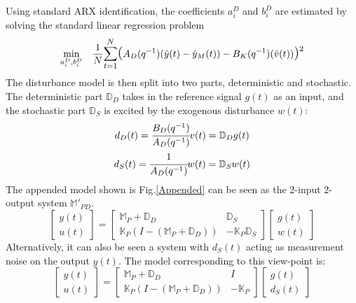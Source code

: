 \documentclass[letterpaper, 10 pt, conference]{ieeeconf}  %
\begin{document}
	Using standard ARX identification, the coefficients $a_i^D$ and $b_i^D$ are estimated by solving the standard linear regression problem
	\begin{equation}
	\begin{aligned}
	& \underset{a_i^D,b_i^D}{\text{min}}
	& & \frac{1}{N}\mathlarger{\sum\limits_{t=1}^N}\mathlarger{\mathlarger{(}}A_D(q^{-1})(\hat{y}(t)-\hat{y}_M(t))-B_K(q^{-1})(\hat{v}(t))\mathlarger{\mathlarger{)}}^2 \\
	\end{aligned}
	\label{DSensor}
	\end{equation}
	The disturbance model is then split into two parts, deterministic and stochastic. The deterministic part $\mathbb{D}_D$ takes in the reference signal $g(t)$ as an input, and the stochastic part $\mathbb{D}_S$ is excited by the exogenous disturbance $w(t)$:
	\begin{equation*}
	\begin{matrix}
	d_D(t) = \cfrac{B_D(q^{-1})}{A_D(q^{-1})}v(t) = \mathbb{D}_D g(t) \vspace{4pt} \\  
	d_S(t) = \cfrac{1}{A_D(q^{-1})}w(t) = \mathbb{D}_S w(t)
	\end{matrix}
	\end{equation*}
	The appended model shown is Fig.\ref{Appended} can be seen as the 2-input 2-output system $\mathbb{M}'_{PD}$.
	\begin{equation}
	\begin{bmatrix}
	y(t) \\ u(t)
	\end{bmatrix} = 
	\begin{bmatrix} 
	\mathbb{M}_P+\mathbb{D}_D & \mathbb{D}_S \\
	\mathbb{K}_P(I-(\mathbb{M}_P+\mathbb{D}_D)) &  -\mathbb{K}_P\mathbb{D}_S
	\end{bmatrix}
	\begin{bmatrix}
	g(t) \\ w(t)
	\end{bmatrix}
	\label{TF_w}
	\end{equation}
	Alternatively, it can also be seen a system with $d_S(t)$ acting as measurement noise on the output $y(t)$. The model corresponding to this view-point is:
	\begin{equation}
	\begin{bmatrix}
	y(t) \\ u(t)
	\end{bmatrix} = 
	\begin{bmatrix} 
	\mathbb{M}_P+\mathbb{D}_D & I \\
	\mathbb{K}_P(I-(\mathbb{M}_P+\mathbb{D}_D)) &  -\mathbb{K}_P
	\end{bmatrix}
	\begin{bmatrix}
	g(t) \\ d_S(t)
	\end{bmatrix}
	\label{TF_d}
	\end{equation} 
\end{document}

